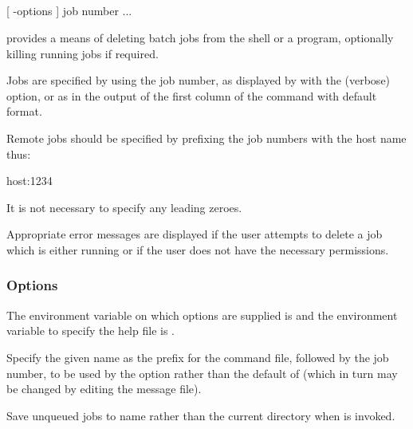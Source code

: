 \subsection{\BtjdelName}

\begin{expara}

\BtjdelName{} [ -options ] job number ...

\end{expara}

\PrBtjdel{} provides a means of deleting batch jobs from the shell or a program, optionally killing running jobs if
required.

Jobs are specified by using the job number, as displayed by \PrBtr{} with the 
(verbose) option, or as in the output of the first column of the \PrBtjlist{} command with default format.

Remote jobs should be specified by prefixing the job numbers with the host name thus:

\begin{expara}

host:1234

\end{expara}

It is not necessary to specify any leading zeroes.

Appropriate error messages are displayed if the user attempts to delete a job which is either running or if the user does not have the
necessary permissions.

\subsubsection{Options}
The environment variable on which options are supplied is \filename{\BtjdelVarname} and the environment variable to specify the
help file is .

\explainopt


Specify the given name as the prefix for the command file, followed by the job number, to be used by the
 option rather than the default of  (which in turn may be changed by editing the
message file).


Save unqueued jobs to name rather than the current directory when \PrBtjdel{} is invoked.

